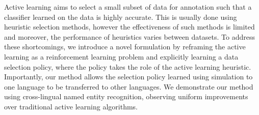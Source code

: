 Active learning aims to select a small subset of data for annotation such that a classifier learned on the data is highly accurate. This is usually done using heuristic selection methods, however the effectiveness of such methods is limited and moreover, the performance of heuristics varies between datasets. To address these shortcomings, we introduce a novel formulation by reframing the active learning as a reinforcement learning problem and explicitly learning a data selection policy, where the policy takes the role of the active learning heuristic. Importantly, our method allows the selection policy learned using simulation to one language to be transferred to other languages. We demonstrate our method using cross-lingual named entity recognition, observing uniform improvements over traditional active learning algorithms.
